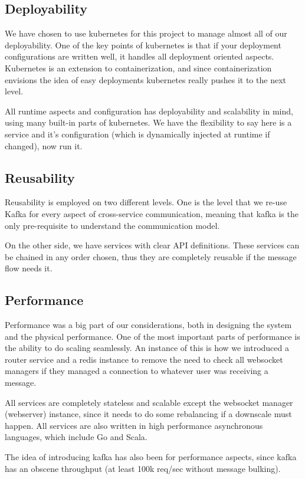 \subsection{Deployability}
We have chosen to use kubernetes for this project to manage almost all of our deployability.
One of the key points of kubernetes is that if your deployment configurations are written well, it handles all deployment oriented aspects.
Kubernetes is an extension to containerization, and since containerization envisions the idea of easy deployments kubernetes really pushes it to the next level.

All runtime aspects and configuration has deployability and scalability in mind, using many built-in parts of kubernetes.
We have the flexibility to say here is a service and it's configuration (which is dynamically injected at runtime if changed), now run it.
\subsection{Reusability}
Reusability is employed on two different levels.
One is the level that we re-use Kafka for every aspect of cross-service communication, meaning that kafka is the only pre-requisite to understand the communication model.

On the other side, we have services with clear API definitions.
These services can be chained in any order chosen, thus they are completely reusable if the message flow needs it.
\subsection{Performance}
Performance was a big part of our considerations, both in designing the system and the physical performance.
One of the most important parts of performance is the ability to do scaling seamlessly.
An instance of this is how we introduced a router service and a redis instance to remove the need to check all websocket managers if they managed a connection to whatever user was receiving a message.

All services are completely stateless and scalable except the websocket manager (webserver) instance, since it needs to do some rebalancing if a downscale must happen.
All services are also written in high performance asynchronous languages, which include Go and Scala.

The idea of introducing kafka has also been for performance aspects, since kafka has an obscene throughput (at least 100k req/sec without message bulking).
